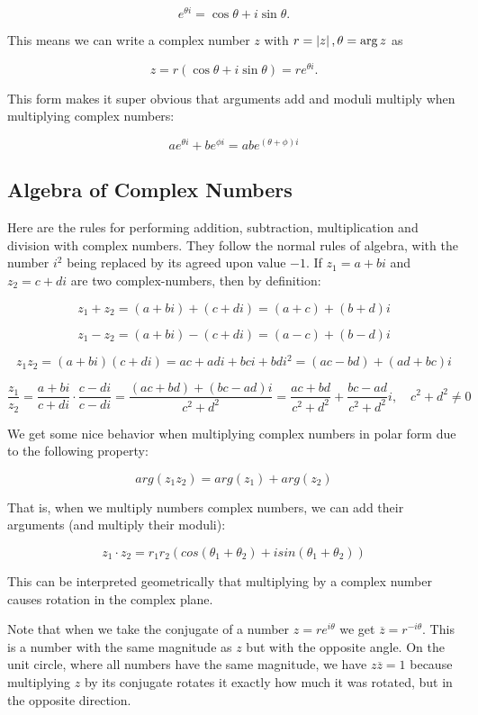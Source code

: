 \documentclass{article}
\begin{document}
\[ e^{\theta i} = \cos\theta + i\sin\theta. \]

This means we can write a complex number $z$ with $r = \left| z \right|, \theta = \arg{z}$ as

\[ z = r(\cos\theta + i\sin\theta) = re^{\theta i}. \]

This form makes it super obvious that arguments add and moduli multiply when multiplying complex numbers:

\[ ae^{\theta i} + be^{\phi i} = abe^{(\theta + \phi) i} \]

\subsection{Algebra of Complex Numbers}

Here are the rules for performing addition, subtraction, multiplication and division with complex numbers. They follow the normal rules of algebra, with the number $i^2$ being replaced by its agreed upon value $-1$. If $z_1 = a + bi$ and $z_2 = c + di$ are two \@{complex-numbers}, then by definition:

\[ z_1 + z_2 = (a + bi) + (c + di) = (a + c) + (b + d)i \tag{18.6} \]

\[ z_1 - z_2 = (a + bi) - (c + di) = (a - c) + (b - d)i \tag{18.61} \] 

\[ z_1z_2 = (a + bi)(c + di) = ac + adi + bci + bdi^2 = (ac - bd) + (ad + bc)i \tag{18.62} \] 

\[ \frac{z_1}{z_2} = \frac{a + bi}{c + di} \cdot \frac{c - di}{c - di} = \frac{(ac + bd) + (bc -ad)i}{c^2 + d^2} = \frac{ac + bd}{c^2 + d^2} +  \frac{bc - ad}{c^2 + d^2}i,\quad c^2 + d^2 \neq 0 \tag{18.63} \]

We get some nice behavior when multiplying complex numbers in polar form due to the following property:

\[ arg(z_1 z_2) = arg(z_1) + arg(z_2) \]

That is, when we multiply numbers complex numbers, we can add their arguments (and multiply their moduli):

\[ z_1 \cdot z_2 = r_1 r_2 (cos(\theta_1 + \theta_2) + isin(\theta_1 + \theta_2)) \]

This can be interpreted geometrically that multiplying by a complex number causes rotation in the complex plane.

Note that when we take the conjugate of a number $z = r e^{i\theta}$ we get $\overline{z} = r^{-i\theta}.$ This is a number with the same magnitude as $z$ but with the opposite angle. On the unit circle, where all numbers have the same magnitude, we have $z \overline{z} = 1$ because multiplying $z$ by its conjugate rotates it exactly how much it was rotated, but in the opposite direction.
\end{document}
